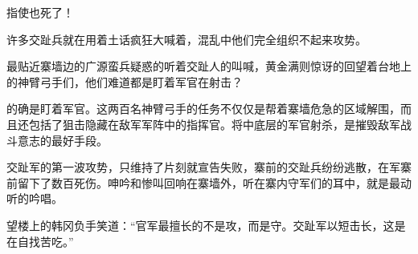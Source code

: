 指使也死了！

许多交趾兵就在用着土话疯狂大喊着，混乱中他们完全组织不起来攻势。

最贴近寨墙边的广源蛮兵疑惑的听着交趾人的叫喊，黄金满则惊讶的回望着台地上的神臂弓手们，他们难道都是盯着军官在射击？

的确是盯着军官。这两百名神臂弓手的任务不仅仅是帮着寨墙危急的区域解围，而且还包括了狙击隐藏在敌军军阵中的指挥官。将中底层的军官射杀，是摧毁敌军战斗意志的最好手段。

交趾军的第一波攻势，只维持了片刻就宣告失败，寨前的交趾兵纷纷逃散，在军寨前留下了数百死伤。呻吟和惨叫回响在寨墙外，听在寨内守军们的耳中，就是最动听的吟唱。

望楼上的韩冈负手笑道：“官军最擅长的不是攻，而是守。交趾军以短击长，这是在自找苦吃。”

